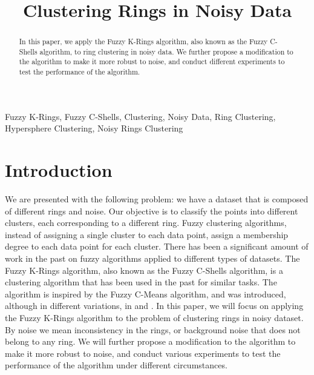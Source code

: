 \documentclass[conference]{IEEEtran}
\begin{document}
\title{Clustering Rings in Noisy Data}

\author{

}
\maketitle

\begin{abstract}
In this paper, we apply the Fuzzy K-Rings algorithm, also known as the Fuzzy C-Shells algorithm, to ring clustering in noisy data.
We further propose a modification to the algorithm to make it more robust to noise, and conduct different experiments to test the performance of the algorithm.
\end{abstract}

\begin{IEEEkeywords}
Fuzzy K-Rings, Fuzzy C-Shells, Clustering, Noisy Data, Ring Clustering, Hypersphere Clustering, Noisy Rings Clustering
\end{IEEEkeywords}

\section{Introduction}
We are presented with the following problem: we have a dataset that is composed of different rings and noise. Our objective is to classify the points into different clusters,
each corresponding to a different ring. Fuzzy clustering algorithms, instead of assigning a single cluster to each data point, assign a membership degree to each data point for each cluster. There has been a significant
amount of work in the past on fuzzy algorithms applied to different types of datasets. The Fuzzy K-Rings algorithm, also known as the Fuzzy C-Shells algorithm, is a clustering algorithm that has been used in the past
for similar tasks. The algorithm is inspired by the Fuzzy C-Means algorithm, and was introduced, although in different variations, in \cite{308484} and \cite{DAVE1992713}. In this paper,
we will focus on applying the Fuzzy K-Rings algorithm to the problem of clustering rings in noisy dataset. By noise we mean inconsistency in the rings, or background noise that does not belong to any ring.
We will further propose a modification to the algorithm to make it more robust to noise, and conduct various experiments to test the performance of the algorithm under different circumstances.
\end{document}
